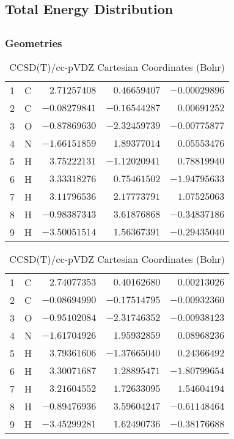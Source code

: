 \documentclass[10pt,oneside]{article}
\begin{document}
\begin{table}
\subsection*{Total Energy Distribution}
\centering\end{table}

\clearpage

\subsection{}

\begin{table}[h!]
\subsubsection*{Geometries}
\begin{multicols}{2}
\centering
\caption{CCSD(T)/cc-pVTZ Cartesian Coordinates (Bohr)}
\begin{tabular}{llrrr}
\toprule
1  & C  & $ 2.71257408$ & $ 0.46659407$ & $-0.00029896$ \\
2  & C  & $-0.08279841$ & $-0.16544287$ & $ 0.00691252$ \\
3  & O  & $-0.87869630$ & $-2.32459739$ & $-0.00775877$ \\
4  & N  & $-1.66151859$ & $ 1.89377014$ & $ 0.05553476$ \\
5  & H  & $ 3.75222131$ & $-1.12020941$ & $ 0.78819940$ \\
6  & H  & $ 3.33318276$ & $ 0.75461502$ & $-1.94795633$ \\
7  & H  & $ 3.11796536$ & $ 2.17773791$ & $ 1.07525063$ \\
8  & H  & $-0.98387343$ & $ 3.61876868$ & $-0.34837186$ \\
9  & H  & $-3.50051514$ & $ 1.56367391$ & $-0.29435040$ \\
\bottomrule
\end{tabular}
\caption{CCSD(T)/cc-pVDZ Cartesian Coordinates (Bohr)}
\begin{tabular}{llrrr}
\toprule
1  & C  & $ 2.74077353$ & $ 0.40162680$ & $ 0.00213026$ \\
2  & C  & $-0.08694990$ & $-0.17514795$ & $-0.00932360$ \\
3  & O  & $-0.95102084$ & $-2.31746352$ & $-0.00938123$ \\
4  & N  & $-1.61704926$ & $ 1.95932859$ & $ 0.08968236$ \\
5  & H  & $ 3.79361606$ & $-1.37665040$ & $ 0.24366492$ \\
6  & H  & $ 3.30071687$ & $ 1.28895471$ & $-1.80799654$ \\
7  & H  & $ 3.21604552$ & $ 1.72633095$ & $ 1.54604194$ \\
8  & H  & $-0.89476936$ & $ 3.59604247$ & $-0.61148464$ \\
9  & H  & $-3.45299281$ & $ 1.62490736$ & $-0.38176688$ \\
\bottomrule
\end{tabular}
\end{multicols}
\end{table}
\end{document}
